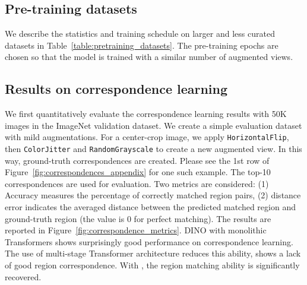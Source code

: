 \documentclass{article} \usepackage{iclr2022_conference,times}
\begin{document}
\subsection{Pre-training datasets}

We describe the statistics and training schedule on larger and less curated datasets in Table~\ref{table:pretraining_datasets}.  The pre-training epochs are chosen so that the model is trained with a similar number of augmented views.



\begin{table}[h!]
  \centering
  \vspace{1mm}
\caption{Pre-train dataset statistics and training schedule.}
  \label{table:pretraining_datasets}  
  \vspace{-2mm}
\end{table}



\subsection{Results on correspondence learning}
\label{sec:correspondence_imagenet}
We first quantitatively evaluate the correspondence learning results with 50K images in the ImageNet validation dataset. We create a simple evaluation dataset with mild augmentations. For a center-crop image, we apply \texttt{HorizontalFlip}, then \texttt{ColorJitter} and \texttt{RandomGrayscale} to create a new augmented view. In this way, ground-truth correspondences are created. Please see the 1st row of Figure~\ref{fig:correspondences_appendix} for one such example. The top-10 correspondences are used for evaluation. Two metrics are considered: (1) Accuracy measures the percentage of correctly matched region pairs, (2) distance error indicates the averaged  distance between the predicted matched region and ground-truth region (the value is 0 for perfect matching). The results are reported in Figure~\ref{fig:correspondence_metrics}. DINO with monolithic Transformers shows surprisingly good performance on correspondence learning. The use of multi-stage Transformer architecture  reduces this ability, shows a lack of good region correspondence. With , the region matching ability is significantly recovered.
\end{document}
